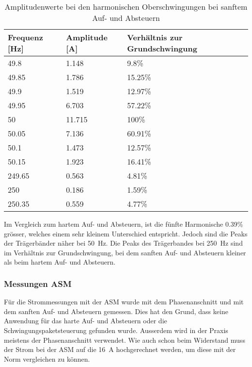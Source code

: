 \begin{table}[ht!]
	\centering
	\begin{tabular}{|l|l|l|}
		\hline
		Frequenz {[}Hz{]} & Amplitude {[}A{]} & Verhältnis zur Grundschwingung	\\ \hline
		49.8              & 1.148             & 9.8\%							\\ \hline
		49.85             & 1.786             & 15.25\%							\\ \hline
		49.9              & 1.519             & 12.97\%							\\ \hline
		49.95             & 6.703             & 57.22\%							\\ \hline
		50                & 11.715            & 100\%							\\ \hline
		50.05             & 7.136             & 60.91\%							\\ \hline
		50.1              & 1.473             & 12.57\%							\\ \hline
		50.15             & 1.923             & 16.41\%							\\ \hline
		249.65            & 0.563             & 4.81\%							\\ \hline
		250               & 0.186             & 1.59\%							\\ \hline
		250.35            & 0.559             & 4.77\%							\\ \hline
	\end{tabular}
	\caption{Amplitudenwerte bei den harmonischen Oberschwingungen bei sanftem Auf- und Absteuern}\label{tab:Sanft_langsam_stroeme}
\end{table}

Im Vergleich zum hartem Auf- und Absteuern, ist die fünfte Harmonische 0.39\% grösser, welches einem sehr kleinem Unterschied entspricht. Jedoch sind die Peaks der Trägerbänder näher bei \SI{50}{Hz}. Die Peaks des Trägerbandes bei \SI{250}{Hz} sind im Verhältnis zur Grundschwingung, bei dem sanften Auf- und Absteuern kleiner als beim hartem Auf- und Absteuern.



\newpage
\subsubsection{Messungen ASM}
Für die Strommessungen mit der ASM wurde mit dem Phasenanschnitt und mit dem sanften Auf- und Absteuern gemessen. Dies hat den Grund, dass keine Anwendung für das harte Auf- und Absteuern oder die Schwingungspaketsteuerung gefunden wurde. Ausserdem wird in der Praxis meistens der Phasenanschnitt verwendet. Wie auch schon beim Widerstand muss der Strom bei der ASM auf die \SI{16}{A} hochgerechnet werden, um diese mit der Norm vergleichen zu können.

